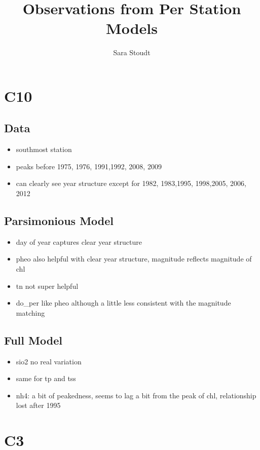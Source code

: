 \documentclass[12pt]{amsart}
\title{Observations from Per Station Models}
\author{Sara Stoudt}
\begin{document}
\maketitle

\section{C10}
\subsection{Data}
\begin{itemize}
\item southmost station
\item peaks before 1975, 1976, 1991,1992, 2008, 2009
\item can clearly see year structure except for 1982, 1983,1995, 1998,2005, 2006, 2012
\end{itemize}

\subsection{Parsimonious Model}

\begin{itemize}
\item day of year captures clear year structure
\item pheo also helpful with clear year structure, magnitude reflects magnitude of chl
\item tn not super helpful
\item do_per like pheo although a little less consistent with the magnitude matching
\end{itemize}

\subsection{Full Model}

\begin{itemize}
\item sio2 no real variation 
\item same for tp and tss
\item nh4: a bit of peakedness, seems to lag a bit from the peak of chl, relationship lost after 1995

\end{itemize}

\section{C3}
\end{document}
